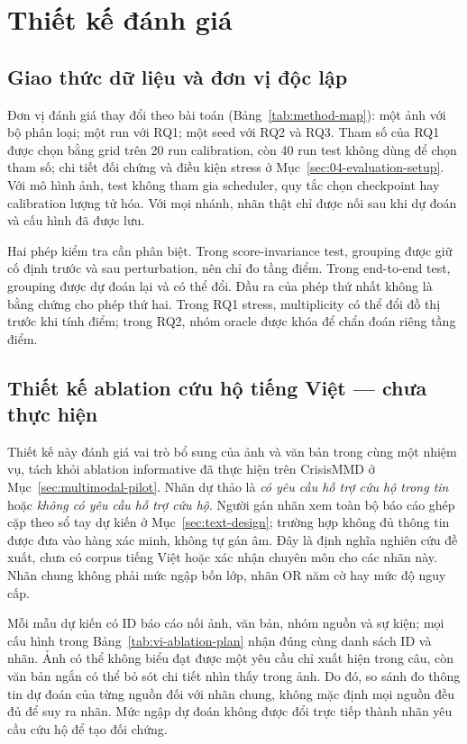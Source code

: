 \section{Thiết kế đánh giá}\label{sec:02-evaluation-design}
\subsection{Giao thức dữ liệu và đơn vị độc lập}
Đơn vị đánh giá thay đổi theo bài toán (Bảng~\ref{tab:method-map}): một ảnh với bộ phân loại; một run với RQ1; một seed với RQ2 và RQ3. Tham số của RQ1 được chọn bằng grid trên 20 run calibration, còn 40 run test không dùng để chọn tham số; chi tiết đối chứng và điều kiện stress ở Mục~\ref{sec:04-evaluation-setup}. Với mô hình ảnh, test không tham gia scheduler, quy tắc chọn checkpoint hay calibration lượng tử hóa. Với mọi nhánh, nhãn thật chỉ được nối sau khi dự đoán và cấu hình đã được lưu.

Hai phép kiểm tra cần phân biệt. Trong score-invariance test, grouping được giữ cố định trước và sau perturbation, nên chỉ đo tầng điểm. Trong end-to-end test, grouping được dự đoán lại và có thể đổi. Đầu ra của phép thứ nhất không là bằng chứng cho phép thứ hai. Trong RQ1 stress, multiplicity có thể đổi đồ thị trước khi tính điểm; trong RQ2, nhóm oracle được khóa để chẩn đoán riêng tầng điểm.

\subsection{Thiết kế ablation cứu hộ tiếng Việt --- chưa thực hiện}\label{sec:vi-ablation-plan}
Thiết kế này đánh giá vai trò bổ sung của ảnh và văn bản trong cùng một nhiệm vụ, tách khỏi ablation informative đã thực hiện trên CrisisMMD ở Mục~\ref{sec:multimodal-pilot}. Nhãn dự thảo là \emph{có yêu cầu hỗ trợ cứu hộ trong tin} hoặc \emph{không có yêu cầu hỗ trợ cứu hộ}. Người gán nhãn xem toàn bộ báo cáo ghép cặp theo sổ tay dự kiến ở Mục~\ref{sec:text-design}; trường hợp không đủ thông tin được đưa vào hàng xác minh, không tự gán âm. Đây là định nghĩa nghiên cứu đề xuất, chưa có corpus tiếng Việt hoặc xác nhận chuyên môn cho các nhãn này. Nhãn chung không phải mức ngập bốn lớp, nhãn OR năm cờ hay mức độ nguy cấp.

Mỗi mẫu dự kiến có ID báo cáo nối ảnh, văn bản, nhóm nguồn và sự kiện; mọi cấu hình trong Bảng~\ref{tab:vi-ablation-plan} nhận đúng cùng danh sách ID và nhãn. Ảnh có thể không biểu đạt được một yêu cầu chỉ xuất hiện trong câu, còn văn bản ngắn có thể bỏ sót chi tiết nhìn thấy trong ảnh. Do đó, so sánh đo thông tin dự đoán của từng nguồn đối với nhãn chung, không mặc định mọi nguồn đều đủ để suy ra nhãn. Mức ngập dự đoán không được đổi trực tiếp thành nhãn yêu cầu cứu hộ để tạo đối chứng.

